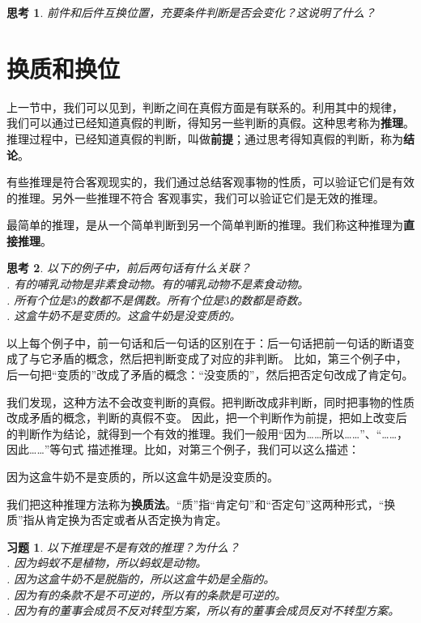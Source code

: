 \documentclass[12pt,UTF8]{ctexbook}
\newtheorem{sk}{思考}[section]
\newtheorem{xt}{习题}[section]
\begin{document}
\begin{sk}\label{sk:2-0-2} 前件和后件互换位置，充要条件判断是否会变化？这说明了什么？
\end{sk}

\section{换质和换位}
上一节中，我们可以见到，判断之间在真假方面是有联系的。利用其中的规律，
我们可以通过已经知道真假的判断，得知另一些判断的真假。这种思考称为\textbf{推理}。
推理过程中，已经知道真假的判断，叫做\textbf{前提}；通过思考得知真假的判断，称为\textbf{结论}。

有些推理是符合客观现实的，我们通过总结客观事物的性质，可以验证它们是有效的推理。另外一些推理不符合
客观事实，我们可以验证它们是无效的推理。

最简单的推理，是从一个简单判断到另一个简单判断的推理。我们称这种推理为\textbf{直接推理}。
\begin{sk}\label{sk:2-1-0} 
    以下的例子中，前后两句话有什么关联？\\
    . 有的哺乳动物是非素食动物。有的哺乳动物不是素食动物。\\
    . 所有个位是$3$的数都不是偶数。所有个位是$3$的数都是奇数。\\
    . 这盒牛奶不是变质的。这盒牛奶是没变质的。
\end{sk}
以上每个例子中，前一句话和后一句话的区别在于：后一句话把前一句话的断语变成了与它矛盾的概念，然后把判断变成了对应的非判断。
比如，第三个例子中，后一句把“变质的”改成了矛盾的概念：“没变质的”，然后把否定句改成了肯定句。

我们发现，这种方法不会改变判断的真假。把判断改成非判断，同时把事物的性质改成矛盾的概念，判断的真假不变。
因此，把一个判断作为前提，把如上改变后的判断作为结论，就得到一个有效的推理。我们一般用“因为……所以……”、“……，因此……”等句式
描述推理。比如，对第三个例子，我们可以这么描述：

因为这盒牛奶不是变质的，所以这盒牛奶是没变质的。

我们把这种推理方法称为\textbf{换质法}。“质”指“肯定句”和“否定句”这两种形式，“换质”指从肯定换为否定或者从否定换为肯定。
\begin{xt}\label{xt:2-0-0}
    以下推理是不是有效的推理？为什么？\\
    . 因为蚂蚁不是植物，所以蚂蚁是动物。 \\
    . 因为这盒牛奶不是脱脂的，所以这盒牛奶是全脂的。 \\
    . 因为有的条款不是不可逆的，所以有的条款是可逆的。 \\
    . 因为有的董事会成员不反对转型方案，所以有的董事会成员反对不转型方案。
\end{xt}
\end{document}
